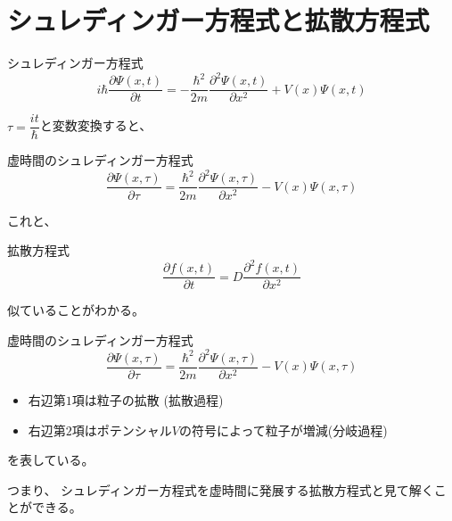 \documentclass[dvipdfmx]{beamer}
\begin{document}
    \section{シュレディンガー方程式と拡散方程式}

    \begin{frame}
        シュレディンガー方程式
        \begin{equation}
            i\hbar\dfrac{\partial \Psi(x,t)}{\partial t} = -\dfrac{\hbar^2}{2m}\dfrac{\partial^2 \Psi(x,t)}{\partial x^2} + V(x)\Psi(x,t)
        \end{equation}

        $\tau = \dfrac{it}{\hbar}$と変数変換すると、

        \begin{block}{虚時間のシュレディンガー方程式}
            \begin{equation}
                \label{tmp1}
        \dfrac{\partial \Psi(x,\tau)}{\partial \tau} = \dfrac{\hbar^2}{2m}\dfrac{\partial^2 \Psi(x,\tau)}{\partial x^2} - V(x)\Psi(x,\tau)
            \end{equation}
        \end{block}
        これと、
        \begin{block}{拡散方程式}
            \begin{equation}
                \dfrac{\partial f(x,t)}{\partial t} = D \dfrac{\partial^2 f(x,t)}{\partial x^2}
            \end{equation}
        \end{block}
        似ていることがわかる。
    \end{frame}

    \begin{frame}

        \begin{block}{虚時間のシュレディンガー方程式}
            \begin{equation}
                \label{tmp1}
        \dfrac{\partial \Psi(x,\tau)}{\partial \tau} = \dfrac{\hbar^2}{2m}\dfrac{\partial^2 \Psi(x,\tau)}{\partial x^2} - V(x)\Psi(x,\tau)
            \end{equation}
        \end{block}

        \begin{itemize}
            \item 右辺第$1$項は粒子の拡散 (拡散過程)
            \item 右辺第$2$項はポテンシャル$V$の符号によって粒子が増減(分岐過程)
        \end{itemize}

        を表している。

        つまり、
        \alert{シュレディンガー方程式を虚時間に発展する拡散方程式と見て解くことができる。}
    \end{frame}
\end{document}
